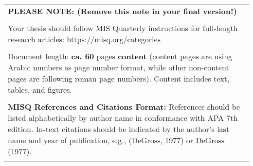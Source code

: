 \begin{table}[h!]
    \centering
    \begin{tabular}{|p{\textwidth}|}
    \hline
    {\color[HTML]{FE0000} \textbf{PLEASE NOTE: (Remove this note in your final version!)}} \\
                                        \\
    {\color[HTML]{FE0000} Your thesis should follow MIS Quarterly instructions for  full-length research articles: https://misq.org/categories} \\
                                        \\
    Document length: \textbf{ca. 60} pages \textbf{content} (content pages are using Arabic numbers as page number format, while other non-content pages are following roman page numbers). Content includes text, tables, and figures. \\
                                        \\
    \textbf{MISQ References and Citations Format:} References should be listed alphabetically by author name in conformance with APA 7th edition. In-text citations should be indicated by the author’s last name and year of publication, e.g., (DeGross, 1977) or DeGross (1977). \\
                                        \\ \hline
    \end{tabular}
    \label{tab:my-table}
    \end{table}